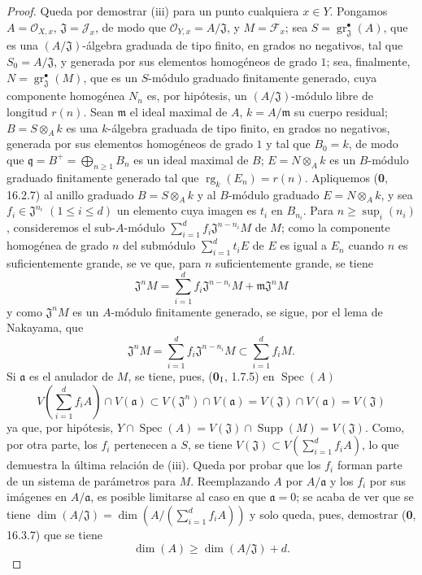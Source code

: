 \begin{proof}
Queda por demostrar (iii) para un punto cualquiera $x\in Y$. Pongamos
$A=\mathcal O_{X,x}$, $\mathfrak J=\mathcal J_x$, de modo que
$\mathcal O_{Y,x}=A/\mathfrak J$, y $M=\mathcal F_x$; sea
$S=\operatorname{gr}_{\mathfrak J}^{\bullet}(A)$, que es una
$(A/\mathfrak J)$-álgebra graduada de tipo finito, en grados no negativos, tal
que $S_0=A/\mathfrak J$, y generada por sus elementos homogéneos de grado
$1$; sea, finalmente,
$N=\operatorname{gr}_{\mathfrak J}^{\bullet}(M)$, que es un $S$-módulo
graduado finitamente generado, cuya componente homogénea $N_n$ es, por hipótesis,
un $(A/\mathfrak J)$-módulo libre de longitud $r(n)$. Sean $\mathfrak m$
el ideal maximal de $A$, $k=A/\mathfrak m$ su cuerpo residual;
$B=S\otimes_A k$ es una $k$-álgebra graduada de tipo finito, en grados
no negativos, generada por sus elementos homogéneos de grado $1$ y tal que
$B_0=k$, de modo que $\mathfrak q=B^+=\bigoplus_{n\geq1}B_n$ es un ideal
maximal de $B$; $E=N\otimes_A k$ es un $B$-módulo graduado finitamente generado
tal que $\operatorname{rg}_k(E_n)=r(n)$. Apliquemos (\textbf 0, 16.2.7) al anillo
graduado $B=S\otimes_A k$ y al $B$-módulo graduado $E=N\otimes_A k$, y sea
$f_i\in\mathfrak J^{n_i}$ $(1\leq i\leq d)$ un elemento cuya imagen es $t_i$
en $B_{n_i}$. Para $n\geq\sup_i(n_i)$, consideremos el sub-$A$-módulo
$\sum_{i=1}^{d}f_i\mathfrak J^{n-n_i}M$ de $M$; como la componente homogénea
de grado $n$ del submódulo $\sum_{i=1}^{d}t_iE$ de $E$ es igual a
$E_n$ cuando $n$ es suficientemente grande, se ve que, para $n$ suficientemente grande, se tiene
\[
\mathfrak J^nM=\sum_{i=1}^{d}f_i\mathfrak J^{n-n_i}M+
\mathfrak m\mathfrak J^nM
\]
y como $\mathfrak J^nM$ es un $A$-módulo finitamente generado, se sigue,
por el lema de Nakayama, que
\[
\mathfrak J^nM=\sum_{i=1}^{d}f_i\mathfrak J^{n-n_i}M
\subset\sum_{i=1}^{d}f_iM.
\]
Si $\mathfrak a$ es el anulador de $M$, se tiene, pues, (\textbf{0}$_{\rm I}$, 1.7.5)
en $\operatorname{Spec}(A)$
\[
V\left(\sum_{i=1}^{d}f_iA\right)\cap V(\mathfrak a)
\subset V(\mathfrak J^n)\cap V(\mathfrak a)
=V(\mathfrak J)\cap V(\mathfrak a)=V(\mathfrak J)
\]
ya que, por hipótesis,
$Y\cap\operatorname{Spec}(A)=V(\mathfrak J)\cap\operatorname{Supp}(M)
=V(\mathfrak J)$. Como, por otra parte, los $f_i$ pertenecen a
$S$, se tiene
$V(\mathfrak J)\subset V(\sum_{i=1}^{d}f_iA)$, lo que demuestra la última
relación de (iii). Queda por probar que los $f_i$ forman parte de un sistema
de parámetros para $M$. Reemplazando $A$ por $A/\mathfrak a$ y los $f_i$ por
sus imágenes en $A/\mathfrak a$, es posible limitarse al caso en que
$\mathfrak a=0$; se acaba de ver que se tiene
$\dim(A/\mathfrak J)=\dim(A/(\sum_{i=1}^{d}f_iA))$
y solo queda, pues, demostrar (\textbf 0, 16.3.7) que se tiene
\[
\dim(A)\geq\dim(A/\mathfrak J)+d.
\]


\end{proof}
